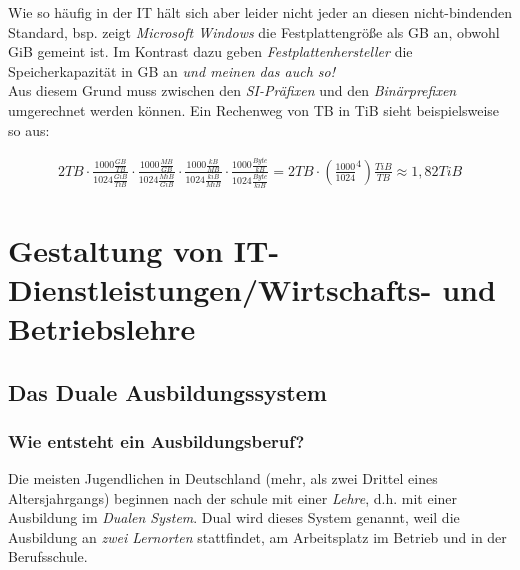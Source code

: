 \documentclass[a4paper, 12pt]{report}
\begin{document}
Wie so häufig in der IT hält sich aber leider nicht jeder an diesen 
nicht-bindenden Standard, bsp. zeigt \emph{Microsoft Windows} die 
Festplattengröße als GB an, obwohl GiB gemeint ist. Im Kontrast dazu geben
\emph{Festplattenhersteller} die Speicherkapazität in GB an \emph{und meinen 
das auch so!} \\

Aus diesem Grund muss zwischen den \emph{SI-Präfixen} und den 
\emph{Binärprefixen} umgerechnet werden können. Ein Rechenweg von TB in 
TiB sieht beispielsweise so aus: 

\begin{center}
    \begin{equation}
        \begin{split}
            2TB \cdot \frac{1000 \frac{GB}{TB}}{1024 \frac{GiB}{TiB}} 
            \cdot \frac{1000 \frac{MB}{GB}}{1024 \frac{MiB}{GiB}} 
            \cdot \frac{1000 \frac{kB}{MB}}{1024 \frac{kiB}{MiB}} 
            \cdot \frac{1000 \frac{Byte}{kB}}{1024 \frac{Byte}{kiB}} 
            = 2TB \cdot \left( \frac{1000}{1024}^4 \right) \frac{TiB}{TB} 
            \approx 1,82 TiB
        \end{split}
    \end{equation}
\end{center}



\chapter{Gestaltung von IT-Dienstleistungen/Wirtschafts- und Betriebslehre}

\section{Das Duale Ausbildungssystem}

\subsection{Wie entsteht ein Ausbildungsberuf?}

Die meisten Jugendlichen in Deutschland (mehr, als zwei Drittel eines 
Altersjahrgangs) beginnen nach der schule mit einer \emph{Lehre}, d.h. mit 
einer Ausbildung im \emph{Dualen System}. Dual wird dieses System genannt, weil
die Ausbildung an \emph{zwei Lernorten} stattfindet, am Arbeitsplatz im Betrieb
und in der Berufsschule. \\
\end{document}

